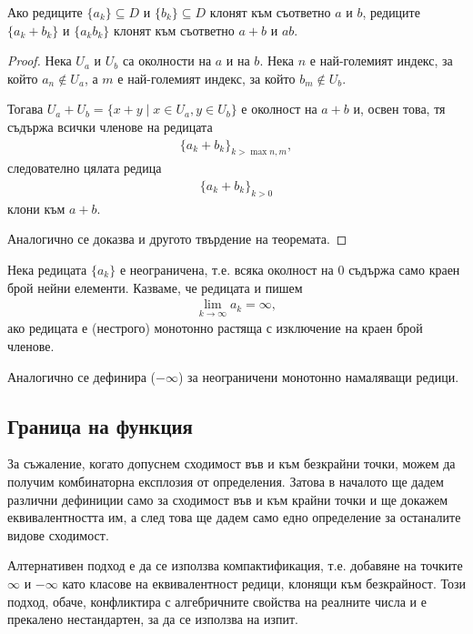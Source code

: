 \documentclass[numbers=endperiod, bibliography=totocnumbered]{scrartcl}
\begin{document}
\begin{proposition}\label{thm:sum-prod-limit}
  Ако редиците \( \{ a_k \} \subseteq D \) и \( \{ b_k \} \subseteq D \) клонят към съответно \( a \) и \( b \), редиците \( \{ a_k + b_k \} \) и \( \{ a_k b_k \} \) клонят към съответно \( a + b \) и \( ab \).
\end{proposition}
\begin{proof}
  Нека \( U_a \) и \( U_b \) са околности на \( a \) и на \( b \). Нека \( n \) е най-големият индекс, за който \( a_n \not\in U_a \), а \( m \) е най-големият индекс, за който \( b_m \not\in U_b \).

  Тогава \( U_a + U_b = \{ x + y \mid x \in U_a, y \in U_b \} \) е околност на \( a + b \) и, освен това, тя съдържа всички членове на редицата
  \begin{align*}
    {\{ a_k + b_k \}}_{k > \max{n, m}},
  \end{align*}
  следователно цялата редица
  \begin{align*}
    {\{ a_k + b_k \}}_{k > 0}
  \end{align*}
  клони към \( a + b \).

  Аналогично се доказва и другото твърдение на теоремата.
\end{proof}

\begin{definition}
  Нека редицата \( \{ a_k \} \) е неограничена, т.е. всяка околност на \( 0 \) съдържа само краен брой нейни елементи. Казваме, че редицата  и пишем
  \begin{align*}
    \lim_{k \to \infty} a_k = \infty,
  \end{align*}
  ако редицата е (нестрого) монотонно растяща с изключение на краен брой членове.

  Аналогично се дефинира  (\( -\infty \)) за неограничени монотонно намаляващи редици.
\end{definition}

\subsection{Граница на функция}

\begin{note}
  За съжаление, когато допуснем сходимост във и към безкрайни точки, можем да получим комбинаторна експлозия от определения. Затова в началото ще дадем различни дефиниции само за сходимост във и към крайни точки и ще докажем еквивалентността им, а след това ще дадем само едно определение за останалите видове сходимост.

  Алтернативен подход е да се използва компактификация, т.е. добавяне на точките \( \infty \) и \( -\infty \) като класове на еквивалентност редици, клонящи към безкрайност. Този подход, обаче, конфликтира с алгебричните свойства на реалните числа и е прекалено нестандартен, за да се използва на изпит.
\end{note}
\end{document}
